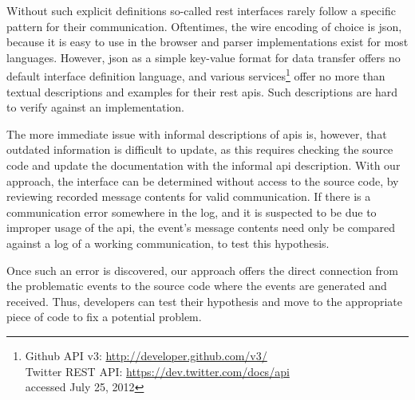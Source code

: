 Without such explicit definitions so-called \ac{rest} interfaces
rarely follow a specific pattern for their communication. Oftentimes,
the wire encoding of choice is \ac{json}, because it is easy to use in
the browser and parser implementations exist for most
languages. However, \ac{json} as a simple key-value format for data
transfer offers no default interface definition language, and various
services\footnote{\xspace\hairspace
  Github API v3: \url{http://developer.github.com/v3/}\\
  Twitter REST API: \url{https://dev.twitter.com/docs/api}\\
  accessed July 25, 2012} offer no more than textual descriptions and
examples for their \ac{rest} \acp{api}. Such descriptions are hard to
verify against an implementation.

The more immediate issue with informal descriptions of \acp{api} is,
however, that outdated information is difficult to update, as this
requires checking the source code and update the documentation with
the informal \ac{api} description. With our approach, the interface
can be determined without access to the source code, by reviewing
recorded message contents for valid communication. If there is a
communication error somewhere in the log, and it is suspected to be
due to improper usage of the \ac{api}, the event's message contents
need only be compared against a log of a working communication, to
test this hypothesis.

Once such an error is discovered, our approach offers the direct
connection from the problematic events to the source code where the
events are generated and received. Thus, developers can test their
hypothesis and move to the appropriate piece of code to fix a
potential problem.

